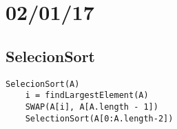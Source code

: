 \documentclass{article}
\begin{document}
\section{02/01/17}
\subsection{SelecionSort}
\begin{lstlisting}
SelecionSort(A)
	i = findLargestElement(A)
	SWAP(A[i], A[A.length - 1])
	SelectionSort(A[0:A.length-2])
\end{lstlisting}
\end{document}
